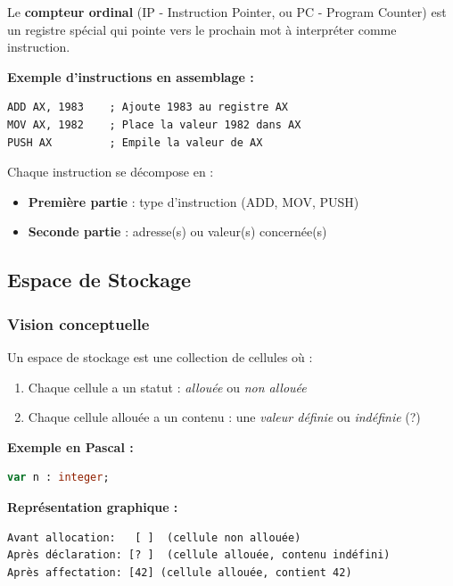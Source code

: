\documentclass[12pt,a4paper]{article}
\begin{document}
\begin{astuce}
Le \textbf{compteur ordinal} (IP - Instruction Pointer, ou PC - Program Counter) est un registre spécial qui pointe vers le prochain mot à interpréter comme instruction.
\end{astuce}

\begin{exemple}
\textbf{Exemple d'instructions en assemblage :}
\begin{lstlisting}[language={[x86masm]Assembler}]
ADD AX, 1983    ; Ajoute 1983 au registre AX
MOV AX, 1982    ; Place la valeur 1982 dans AX
PUSH AX         ; Empile la valeur de AX
\end{lstlisting}

Chaque instruction se décompose en :
\begin{itemize}
    \item \textcolor{titrebleu}{\textbf{Première partie}} : type d'instruction (ADD, MOV, PUSH)
    \item \textcolor{defvert}{\textbf{Seconde partie}} : adresse(s) ou valeur(s) concernée(s)
\end{itemize}
\end{exemple}

\subsection{Espace de Stockage}

\subsubsection{Vision conceptuelle}

\begin{definition}
Un espace de stockage est une collection de cellules où : 
\begin{enumerate}
    \item Chaque cellule a un statut :  \textit{allouée} ou \textit{non allouée}
    \item Chaque cellule allouée a un contenu :  une \textit{valeur définie} ou \textit{indéfinie} (?)
\end{enumerate}
\end{definition}

\begin{exemple}
\textbf{Exemple en Pascal :}
\begin{lstlisting}[language=Pascal]
var n : integer;
\end{lstlisting}

\textbf{Représentation graphique :}
\begin{verbatim}
Avant allocation:   [ ]  (cellule non allouée)
Après déclaration: [? ]  (cellule allouée, contenu indéfini)
Après affectation: [42] (cellule allouée, contient 42)
\end{verbatim}
\end{exemple}
\end{document}
